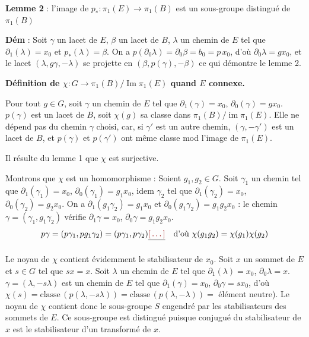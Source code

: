 \documentclass[11pt,a4paper]{article}
\begin{document}
\textbf{Lemme 2} : l'image de $p_{*} : \pi_1(E) \to \pi_1(B)$ est un
sous-groupe distingué de $\pi_1(B)$

\textbf{Dém} : Soit $\gamma$ un lacet de \struck{\ill{}} $E$, $\beta$ un
lacet de $B$, $\lambda$ un chemin de $E$ tel que $\partial_1(\lambda) =
x_0$ et $p_{*}(\lambda) = \beta$. On a $p(\partial_0 \lambda) = \partial_0
\beta = b_0 = p\, x_0$, d'où $\partial_0 \lambda = g x_0$, et le lacet
$(\lambda, g\gamma, -\lambda)$ se projette en $(\beta, p(\gamma), -\beta)$
ce qui démontre le lemme 2.

\textbf{Définition de $\chi : G \to \pi_1(B) / \operatorname{Im}
\pi_1(E)$ quand $E$ connexe.}

Pour tout $g \in G$, soit $\gamma$ un chemin de $E$ tel que
$\partial_1(\gamma) = x_0$, $\partial_0(\gamma) = g x_0$. \struck{\ill{}}
$p(\gamma)$ est un lacet de $B$, soit $\chi(g)$ sa classe dans $\pi_1(B) /
\operatorname{im} \pi_1(E)$. Elle ne dépend pas du chemin $\gamma$ choisi,
car, si $\gamma'$ est un autre chemin, $(\gamma, -\gamma')$ est un lacet de
$B$, et \struck{\ill{}} $p(\gamma)$ et $p(\gamma')$ ont même classe mod
l'image de $\pi_1(E)$.

Il résulte du lemme 1 que $\chi$ est surjective.

Montrons que $\chi$ est \struck{\ill{}} un homomorphisme : Soient $g_1, g_2
\in G$. Soit $\gamma_1$ un  chemin tel que $\partial_1(\gamma_1)
= x_0$, $\partial_0(\gamma_1) = g_1 x_0$, idem \struck{\ill{}} $\gamma_2$
tel que $\partial_1(\gamma_2) = x_0$, $\partial_0(\gamma_2) = g_2 x_0$. On
a $\partial_1(g_1 \gamma_2) = g_1 x_0$ et $\partial_0(g_1 \gamma_2) = g_1
g_2 x_0$ : le chemin $\gamma = (\gamma_1, g_1 \gamma_2)$ vérifie
$\partial_1 \gamma = x_0$, $\partial_0 \gamma = g_1 g_2 x_0$. 
\[
p\gamma = (p\gamma_1, p g_1 \gamma_2) = (p\gamma_1, p\gamma_2) \struck{\ill{}}
\quad \text{d'où } \chi(g_1 g_2) = \chi(g_1)\chi(g_2)
\]

Le noyau de $\chi$ contient évidemment le stabilisateur de $x_0$. Soit $x$
un sommet de $E$ et $s \in G$ tel que $sx = x$. Soit $\lambda$ un chemin de
$E$ tel que $\partial_1(\lambda) = x_0$, $\partial_0 \lambda = x$.
\struck{\ill{}} $\gamma = (\lambda, -s\lambda)$ est un chemin de $E$ tel
que $\partial_1(\gamma) = x_0$, $\partial_0 \gamma = s x_0$, d'où
$\chi(s) = \text{classe}\,(p(\lambda, -s\lambda)) = \text{classe}\,
(p(\lambda, -\lambda)) = $ élément neutre). Le noyau de $\chi$ contient donc
le sous-groupe $S$ \struck{\ill{}} engendré par les stabilisateurs des
\struck{\ill{}} sommets de $E$. Ce sous-groupe est distingué puisque
 conjugué du stabilisateur de $x$ est le stabilisateur d'un
transformé de $x$.
\end{document}
